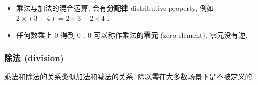 \begin{itemize}
\tightlist
\item
  乘法与加法的混合运算, 会有\textbf{分配律} distributive property, 例如
  \(2×(3+4)=2×3+2×4\) .
\item
  任何数乘上 \(0\) 得到 \(0\) , \(0\) 可以称作乘法的\textbf{零元} (zero
  element), 零元没有逆.
\end{itemize}

\hypertarget{ux9664ux6cd5-division}{%
\subsubsection{除法 (division)}\label{ux9664ux6cd5-division}}

乘法和除法的关系类似加法和减法的关系. 除以零在大多数场景下是不被定义的.
